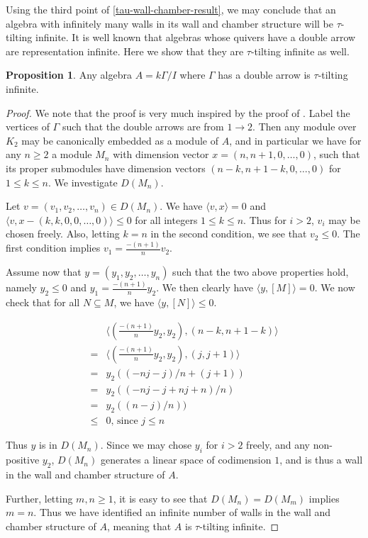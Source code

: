 \documentclass[]{article}
\theoremstyle{definition}
\newtheorem{proposition}{Proposition}[section]
\newcommand{\tu}{\ensuremath{\tau}}
\begin{document}
Using the third point of \cref{tau-wall-chamber-result}, we may conclude that an algebra with infinitely many walls in its wall and chamber structure will be \tu-tilting infinite. It is well known that algebras whose quivers have a double arrow are representation infinite. Here we show that they are \tu-tilting infinite as well.
\begin{proposition}
	Any algebra $A = k\Gamma/I$ where $\Gamma$ has a double arrow is \tu-tilting infinite.
\end{proposition}

\begin{proof}
	We note that the proof is very much inspired by the proof of \cite[Theorem 4.14]{Br_stle_2019}. Label the vertices of $\Gamma$ such that the double arrows are from $1 \to 2$. Then any module over $K_2$ may be canonically embedded as a module of $A$, and in particular we have for any $n \geq 2$ a module $M_n$ with dimension vector $x = (n,n+1,0,\dots,0)$, such that its proper submodules have dimension vectors $(n-k,n+1-k,0,\dots,0)$ for $1 \leq k \leq n$. We investigate $D(M_n)$.
	
	Let $v = (v_1,v_2,\dots,v_n) \in D(M_n)$. We have $\langle v,x \rangle = 0$ and $\langle v,x - (k,k,0,0,\dots,0)\rangle \leq 0$ for all integers $1 \leq k \leq n$. Thus for $i > 2$, $v_i$ may be chosen freely. Also, letting $k = n$ in the second condition, we see that $v_2 \leq 0$. The first condition implies $v_1 = \frac{-(n+1)}{n}v_2$.
	
	Assume now that $y = (y_1,y_2,\dots,y_n)$ such that the two above properties hold, namely $y_2 \leq 0$ and $y_1 = \frac{-(n+1)}{n}y_2$. We then clearly have $\langle y,[M]\rangle = 0$. We now check that for all $N \subseteq M$, we have $\langle y,[N]\rangle \leq 0$. 
	
	\begin{align}
	&\langle (\frac{-(n+1)}{n}y_2,y_2), (n-k,n+1-k)\rangle \\
	=&\langle (\frac{-(n+1)}{n}y_2,y_2), (j,j+1)\rangle \\
	=& y_2((-nj-j)/n + (j+1)) \\
	=& y_2((-nj - j + nj + n)/n) \\
	=& y_2((n-j)/n)) \\
	\leq& 0\text{, since } j \leq n
	\end{align}
	
	Thus $y$ is in $D(M_n)$. Since we may chose $y_i$ for $i > 2$ freely, and any non-positive $y_2$, $D(M_n)$ generates a linear space of codimension $1$, and is thus a wall in the wall and chamber structure of $A$.
	
	Further, letting $m,n \geq 1$, it is easy to see that $D(M_n) = D(M_m)$ implies $m = n$. Thus we have identified an infinite number of walls in the wall and chamber structure of $A$, meaning that $A$ is \tu-tilting infinite.
	
\end{proof}
\end{document}
